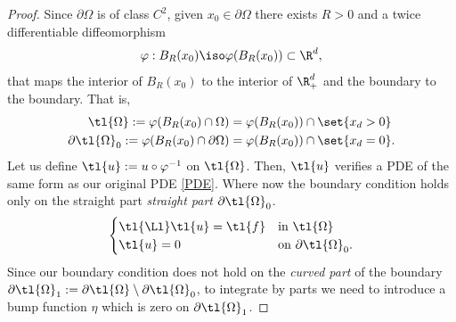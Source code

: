 \documentclass[
    a4paper,
    DIV=14,
    abstract=true,
    numbers=noenddot
]{scrartcl}
\begin{document}
\begin{proof}
    Since $\partial \Omega$ is of class $C^2$, given $x_0 \in \partial \Omega $ there exists $R>0$  and a twice differentiable
    diffeomorphism
    \begin{align*}
        \varphi : B_R(x_0) \iso  \varphi (B_R(x_0)) \subset \R^d,
    \end{align*}
    that maps the interior of $B_R(x_0)$ to the interior of $\R^d_+$   and the boundary to the boundary. That is,
    \begin{align*}
        \tl{\Omega}:= \varphi (B_R(x_0) \cap \Omega ) & =\varphi (B_R(x_0)) \cap \set{x_d>0} \\ \partial \tl{\Omega }_0:= \varphi (B_R(x_0) \cap \partial  \Omega ) &=\varphi (B_R(x_0)) \cap \set{x_d=0}.
    \end{align*}
    Let us define $\tl{u}:= u \circ \varphi ^{-1} $ on $\tl{\Omega }$. Then, $\tl{u}$ verifies a PDE of the same form as our original PDE \eqref{PDE}. Where now the boundary condition holds only on the straight part \emph{straight part} $\partial \tl{\Omega }_0 $.
    \begin{align*}
        \begin{cases}
            \tl{\Ll }\tl{u} =\tl{f} & \text{in } \tl{\Omega }             \\
            \tl{u}=0                & \text{on } \partial \tl{\Omega }_0.
        \end{cases}
    \end{align*}
    Since our boundary condition does not hold on the \emph{curved part} of the boundary $ \partial \tl{\Omega }_1:=  \partial \tl{\Omega }\setminus \partial \tl{\Omega }_0$, to integrate by parts we need to introduce a bump function $\eta$ which is zero on $\partial \tl{\Omega }_1$.


\end{proof}
\end{document}
